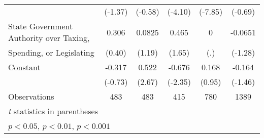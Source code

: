 {\begin{tabular}{l*{5}{c}}
                                        &  (-1.37)         &  (-0.58)         &  (-4.10)         &  (-7.85)         &  (-0.69)         \\
\addlinespace
State Government Authority over Taxing, &    0.306         &   0.0825         &    0.465         &        0         &  -0.0651         \\
Spending, or Legislating                &   (0.40)         &   (1.19)         &   (1.65)         &      (.)         &  (-1.28)         \\
\addlinespace
Constant                                &   -0.317         &    0.522\sym{**} &   -0.676\sym{*}  &    0.168         &   -0.164         \\
                                        &  (-0.73)         &   (2.67)         &  (-2.35)         &   (0.95)         &  (-1.46)         \\
\midrule
Observations                            &      483         &      483         &      415         &      780         &     1389         \\
\bottomrule
\multicolumn{6}{l}{\footnotesize \textit{t} statistics in parentheses}\\
\multicolumn{6}{l}{\footnotesize \sym{*} \(p<0.05\), \sym{**} \(p<0.01\), \sym{***} \(p<0.001\)}\\
\end{tabular}
}

